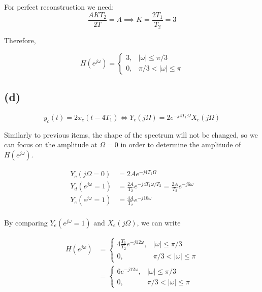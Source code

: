 \documentclass{article}
\begin{document}
For perfect reconstruction we need: 
\begin{equation}
\frac{AKT_2}{2T} = A \implies K = \frac{2T_1}{T_2} = 3
\end{equation}

Therefore,

\begin{equation}
H(e^{j\omega}) = \begin{cases}
3, &|\omega|\leq \pi/3 \\
0, &\pi/3 < |\omega| \leq \pi
\end{cases}
\end{equation}

\subsection{(d)}

\begin{equation}
y_c(t) = 2x_c(t-4T_1) \Longleftrightarrow Y_c(j\Omega) = 2e^{-j4T_1\Omega}X_c(j\Omega)
\end{equation}

Similarly to previous items, the shape of the spectrum will not be changed, so we can focus on the amplitude at $\Omega = 0$ in order to determine the amplitude of $H(e^{j\omega})$. 

\begin{align*}
Y_c(j\Omega = 0) &= 2Ae^{-j4T_1\Omega} \\
Y_d(e^{j\omega} = 1) &= \frac{2A}{T_2}e^{-j4T_1\omega/T_2} = \frac{2A}{T_2}e^{-j6\omega} \tag{since we can interpret $y_d[n] = y_c(nT_2)$} \\
Y_e(e^{j\omega} = 1) &= \frac{4A}{T_2}e^{-j16\omega} \tag{upsampling by 2 with filter scaling 2} \\
\end{align*}

By comparing $Y_e(e^{j\omega} = 1)$ and $X_e(j\Omega)$, we can write

\begin{align} \nonumber
H(e^{j\omega}) &= \begin{cases}
4\frac{T_1}{T_2}e^{-j12\omega}, & |\omega|\leq \pi/3 \\
0, &\pi/3 < |\omega| \leq \pi
\end{cases} \\
&= \begin{cases}
6e^{-j12\omega}, & |\omega|\leq \pi/3 \\
0, &\pi/3 < |\omega| \leq \pi
\end{cases}
\end{align}
\end{document}
